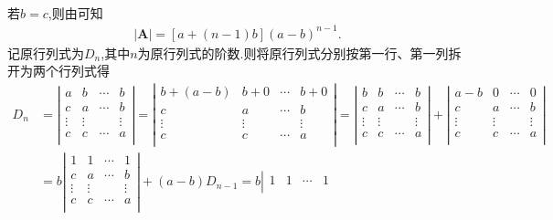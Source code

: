 \documentclass[../../main.tex]{subfiles}
\begin{document}
\begin{solution}
\begin{align*}
\nonumber
\end{align*}
若$b=c$,则由可知
\begin{align*}
|\boldsymbol{A}|=\left[ a+\left( n-1 \right) b \right] \left( a-b \right) ^{n-1}.
\nonumber
\end{align*}
{\color{blue}}
记原行列式为$D_n$,其中$n$为原行列式的阶数.则将原行列式分别按第一行、第一列拆开为两个行列式得
\begin{align*}
D_n&=\left| \begin{matrix}
a&		b&		\cdots&		b\\
c&		a&		\cdots&		b\\
\vdots&		\vdots&		&		\vdots\\
c&		c&		\cdots&		a\\
\end{matrix} \right|=\left| \begin{matrix}
b+\left( a-b \right)&		b+0&		\cdots&		b+0\\
c&		a&		\cdots&		b\\
\vdots&		\vdots&		&		\vdots\\
c&		c&		\cdots&		a\\
\end{matrix} \right|=\left| \begin{matrix}
b&		b&		\cdots&		b\\
c&		a&		\cdots&		b\\
\vdots&		\vdots&		&		\vdots\\
c&		c&		\cdots&		a\\
\end{matrix} \right|+\left| \begin{matrix}
a-b&		0&		\cdots&		0\\
c&		a&		\cdots&		b\\
\vdots&		\vdots&		&		\vdots\\
c&		c&		\cdots&		a\\
\end{matrix} \right|
\\
&=b\left| \begin{matrix}
1&		1&		\cdots&		1\\
c&		a&		\cdots&		b\\
\vdots&		\vdots&		&		\vdots\\
c&		c&		\cdots&		a\\
\end{matrix} \right|+\left( a-b \right) D_{n-1}=b\left| \begin{matrix}
1&		1&		\cdots&		1\\

\end{matrix}
\end{align*}
\end{solution}
\end{document}
